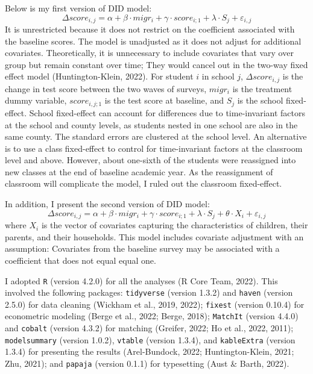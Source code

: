 \documentclass[
  man,floatsintext]{apa7}
\begin{document}
Below is my first version of DID model: \[\Delta score_{i,j} = \alpha + \beta \cdot migr_{i} + \gamma \cdot score_{i;1} + \lambda \cdot S_{j} + \varepsilon_{i,j}\] It is unrestricted because it does not restrict on the coefficient associated with the baseline scores. The model is unadjusted as it does not adjust for additional covariates. Theoretically, it is unnecessary to include covariates that vary over group but remain constant over time; They would cancel out in the two-way fixed effect model (Huntington-Klein, 2022). For student \(i\) in school \(j\), \(\Delta score_{i,j}\) is the change in test score between the two waves of surveys, \(migr_{i}\) is the treatment dummy variable, \(score_{i,j;1}\) is the test score at baseline, and \(S_{j}\) is the school fixed-effect. School fixed-effect can account for differences due to time-invariant factors at the school and county levels, as students nested in one school are also in the same county. The standard errors are clustered at the school level. An alternative is to use a class fixed-effect to control for time-invariant factors at the classroom level and above. However, about one-sixth of the students were reassigned into new classes at the end of baseline academic year. As the reassignment of classroom will complicate the model, I ruled out the classroom fixed-effect.

In addition, I present the second version of DID model: \[\Delta score_{i,j} = \alpha + \beta \cdot migr_{i} + \gamma \cdot score_{i;1} + \lambda \cdot S_{j} + \theta \cdot X_{i} + \varepsilon_{i,j}\] where \(X_{i}\) is the vector of covariates capturing the characteristics of children, their parents, and their households. This model includes covariate adjustment with an assumption: Covariates from the baseline survey may be associated with a coefficient that does not equal equal one.

I adopted \texttt{R} (version 4.2.0) for all the analyses (R Core Team, 2022). This involved the following packages: \texttt{tidyverse} (version 1.3.2) and \texttt{haven} (version 2.5.0) for data cleaning (Wickham et al., 2019, 2022); \texttt{fixest} (version 0.10.4) for econometric modeling (Berge et al., 2022; Berge, 2018); \texttt{MatchIt} (version 4.4.0) and \texttt{cobalt} (version 4.3.2) for matching (Greifer, 2022; Ho et al., 2022, 2011); \texttt{modelsummary} (version 1.0.2), \texttt{vtable} (version 1.3.4), and \texttt{kableExtra} (version 1.3.4) for presenting the results (Arel-Bundock, 2022; Huntington-Klein, 2021; Zhu, 2021); and \texttt{papaja} (version 0.1.1) for typesetting (Aust \& Barth, 2022).
\end{document}
